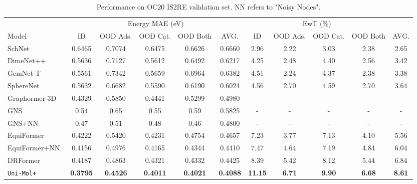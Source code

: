 \documentclass{article}
\newcommand{\name}{\texttt{Uni-Mol+}\xspace}
\begin{document}
\begin{table}[t]
  \small
  \caption{Performance on OC20 IS2RE validation set. NN refers to "Noisy Nodes"\cite{godwin2022simple}.} \label{tab:oc20}
  \addtolength{\tabcolsep}{-3.3pt}
    \begin{tabular}{l|ccccc|ccccc}
    \toprule
    & \multicolumn{5}{|c|}{Energy MAE (eV) } & \multicolumn{4}{|c}{ EwT (\%) }  \\
    Model & {\scriptsize ID} & {\scriptsize OOD Ads. }& {\scriptsize OOD Cat.} & {\scriptsize OOD Both} & {\scriptsize AVG.} & {\scriptsize ID} & {\scriptsize OOD Ads.} & {\scriptsize OOD Cat.} &  {\scriptsize OOD Both} & {\scriptsize AVG.}  \\
    \midrule
    SchNet~\cite{schutt2017schnet} & 0.6465 & 0.7074 & 0.6475 & 0.6626 & 0.6660 & 2.96 & 2.22 & 3.03 & 2.38 & 2.65\\
    DimeNet++~\cite{gasteiger_dimenetpp_2020} & 0.5636 & 0.7127 & 0.5612 & 0.6492 & 0.6217 & 4.25 & 2.48 & 4.40 & 2.56 & 3.42\\
    GemNet-T~\cite{GasteigerBG21} & 0.5561 & 0.7342 & 0.5659 & 0.6964 & 0.6382 & 4.51 & 2.24 & 4.37 & 2.38 & 3.38\\
    SphereNet~\cite{0059WLLZOJ22} & 0.5632 & 0.6682 & 0.5590 & 0.6190 & 0.6024 & 4.56 & 2.70 & 4.59 & 2.70 & 3.64\\
    \midrule
    Graphormer-3D~\cite{shi2022benchmarking} & 0.4329 & 0.5850 & 0.4441 & 0.5299 & 0.4980 & - & - & - & - & -	 \\
    GNS~\cite{godwin2022simple} & 0.54 & 0.65 & 0.55 & 0.59 & 0.5825 & - & - & - & - & -  \\
    GNS+NN~\cite{godwin2022simple} & 0.47 & 0.51 & 0.48 & 0.46 & 0.4800 & - & - & - & - & - \\
    EquiFormer~\cite{liao2022equiformer} & 0.4222 & 0.5420 & 0.4231 & 0.4754 & 0.4657 & 7.23 & 3.77 & 7.13 & 4.10 & 5.56  \\
    EquiFormer+NN~\cite{liao2022equiformer} & 0.4156 & 0.4976 & 0.4165 & 0.4344 & 0.4410 & 7.47 & 4.64 & 7.19 & 4.84 & 6.04 \\
    DRFormer~\cite{wang2023dr} & 0.4187& 0.4863 & 0.4321 & 0.4332 & 0.4425 & 8.39 & 5.42 & 8.12 & 5.44 & 6.84 \\
    \midrule
    \name & \textbf{0.3795} & \textbf{0.4526} & \textbf{0.4011} & \textbf{0.4021} & \textbf{0.4088} & \textbf{11.15} & \textbf{6.71} & \textbf{9.90} & \textbf{6.68} & \textbf{8.61} \\
    \bottomrule
    \end{tabular}
    \vspace{-6pt}
\end{table}
\end{document}
